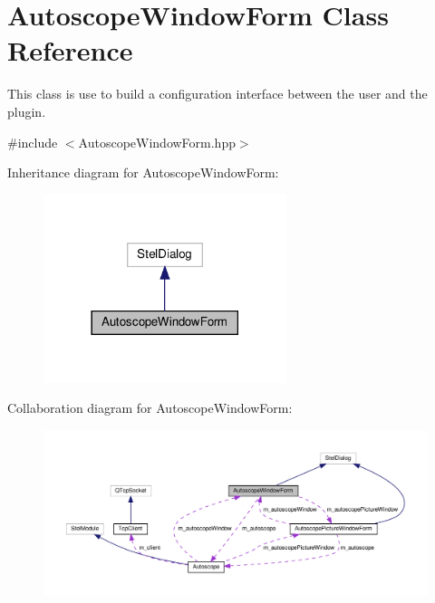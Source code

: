 \hypertarget{class_autoscope_window_form}{}\section{Autoscope\+Window\+Form Class Reference}
\label{class_autoscope_window_form}


This class is use to build a configuration interface between the user and the plugin.  




{\ttfamily \#include $<$Autoscope\+Window\+Form.\+hpp$>$}



Inheritance diagram for Autoscope\+Window\+Form\+:\nopagebreak
\begin{figure}[H]
\begin{center}
\leavevmode
\includegraphics[width=201pt]{class_autoscope_window_form__inherit__graph}
\end{center}
\end{figure}


Collaboration diagram for Autoscope\+Window\+Form\+:\nopagebreak
\begin{figure}[H]
\begin{center}
\leavevmode
\includegraphics[width=350pt]{class_autoscope_window_form__coll__graph}
\end{center}
\end{figure}
